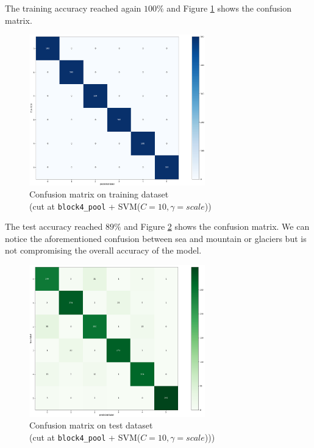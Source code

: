 \documentclass[compsoc]{IEEEtran}
\begin{document}
The training accuracy reached again $100\%$ and Figure \ref{fig:cm2-train} shows the confusion matrix. 


\begin{figure}[ht!]
\centering                                                                        
\includegraphics[width=3in]{../images/cm2-train.png}
\captionsetup{justification=centering}                                                                                         
\caption{Confusion matrix on training dataset \\ (cut at \texttt{block4\_pool} + SVM($C=10, \gamma=scale$))}
\label{fig:cm2-train}                                                                                                                               
\end{figure}

The test accuracy reached $89\%$ and Figure \ref{fig:cm2-test} shows the confusion matrix. We can notice the aforementioned confusion between sea and mountain or glaciers but is not compromising the overall accuracy of the model.


\begin{figure}[ht!]
\centering                                                                        
\includegraphics[width=3in]{../images/cm2-test.png}
\captionsetup{justification=centering}                                                                                         
\caption{Confusion matrix on test dataset \\ (cut at \texttt{block4\_pool} + SVM($C=10, \gamma=scale$)))}
\label{fig:cm2-test}                                                                                                                               
\end{figure}
\end{document}
